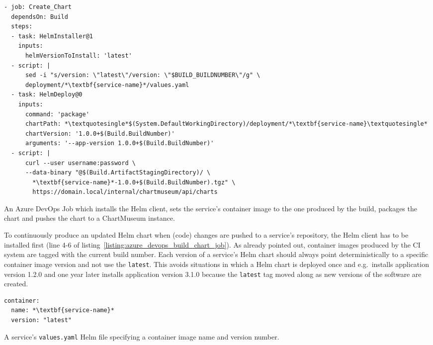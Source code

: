 \begin{listing}[H]
  \begin{verbatim}
- job: Create_Chart
  dependsOn: Build
  steps:
  - task: HelmInstaller@1
    inputs:
      helmVersionToInstall: 'latest'
  - script: |
      sed -i "s/version: \"latest\"/version: \"$BUILD_BUILDNUMBER\"/g" \
      deployment/*\textbf{service-name}*/values.yaml
  - task: HelmDeploy@0
    inputs:
      command: 'package'
      chartPath: *\textquotesingle*$(System.DefaultWorkingDirectory)/deployment/*\textbf{service-name}\textquotesingle*
      chartVersion: '1.0.0+$(Build.BuildNumber)'
      arguments: '--app-version 1.0.0+$(Build.BuildNumber)'
  - script: |
      curl --user username:password \
      --data-binary "@$(Build.ArtifactStagingDirectory)/ \
        *\textbf{service-name}*-1.0.0+$(Build.BuildNumber).tgz" \
        https://domain.local/internal/chartmuseum/api/charts
  \end{verbatim}
  \caption{An Azure DevOps Job which installs the Helm client, sets the
  service's container image to the one produced by the build, packages the
  chart and pushes the chart to a ChartMuseum instance.}%
  \label{listing:azure_devops_build_chart_job}
\end{listing}

To continuously produce an updated Helm chart when (code) changes are pushed to
a service's repository, the Helm client has to be installed first (line 4-6 of
listing~\ref{listing:azure_devops_build_chart_job}). As already pointed out,
container images produced by the \ac{CI} system are tagged with the current
build number. Each version of a service's Helm chart should always point
deterministically to a specific container image version and not use the
\texttt{latest}. This avoids situations in which a Helm chart is deployed once
and e.g.\ installs application version 1.2.0 and one year later installs
application version 3.1.0 because the \texttt{latest} tag moved along as new
versions of the software are created.

\begin{listing}[H]
  \begin{verbatim}
container:
  name: *\textbf{service-name}*
  version: "latest"
  \end{verbatim}
  \caption{A service's \texttt{values.yaml} Helm file specifying a container
  image name and version number.}%
  \label{listing:helm_values_ci_image_version}
\end{listing}

